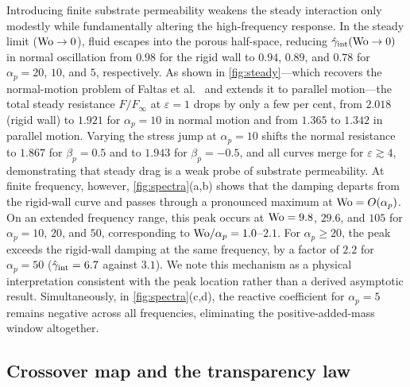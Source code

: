 Introducing finite substrate permeability weakens the steady interaction only modestly while fundamentally altering the
high-frequency response. In the steady limit ($\mathrm{Wo}\to0$), fluid escapes into the porous half-space, reducing
$\hat\gamma_{\rm int}(\mathrm{Wo}\to0)$ in normal oscillation from $0.98$ for the rigid wall to $0.94$, $0.89$, and $0.78$ for
$\alpha_p=20$, $10$, and $5$, respectively. As shown in \cref{fig:steady}---which recovers the normal-motion problem of
Faltas et al.~\cite{faltas2021axisymmetric} and extends it to parallel motion---the total steady resistance
$F/F_\infty$ at $\varepsilon=1$ drops by only a few per cent, from $2.018$ (rigid wall) to $1.921$ for $\alpha_p=10$ in
normal motion and from $1.365$ to $1.342$ in parallel motion. Varying the stress jump at $\alpha_p=10$ shifts the normal
resistance to $1.867$ for $\beta_p=0.5$ and to $1.943$ for $\beta_p=-0.5$, and all curves merge for
$\varepsilon\gtrsim4$, demonstrating that steady drag is a weak probe of substrate permeability. At finite frequency,
however, \cref{fig:spectra}(a,b) shows that the damping departs from the rigid-wall curve and passes through a pronounced
maximum at $\mathrm{Wo}=O(\alpha_p)$. On an extended frequency range, this peak occurs at $\mathrm{Wo}=9.8$, $29.6$, and $105$ for
$\alpha_p=10$, $20$, and $50$, corresponding to $\mathrm{Wo}/\alpha_p=1.0$--$2.1$. For $\alpha_p\ge20$, the peak exceeds the
rigid-wall damping at the same frequency, by a factor of $2.2$ for $\alpha_p=50$ ($\hat\gamma_{\rm int}=6.7$ against
$3.1$).  We note this mechanism as a physical interpretation
consistent with the peak location rather than a derived asymptotic result. Simultaneously, in \cref{fig:spectra}(c,d),
the reactive coefficient for $\alpha_p=5$ remains negative across all frequencies, eliminating the positive-added-mass
window altogether.

\subsection{Crossover map and the transparency law}\label{sec:woc}


